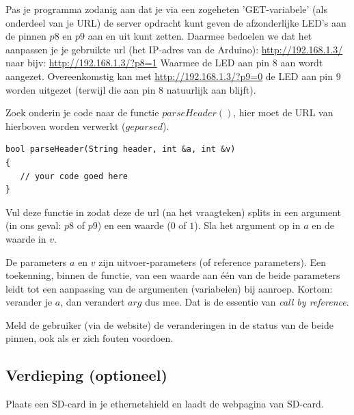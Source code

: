 \begin{exercise}
Pas je programma zodanig aan dat je via een zogeheten 'GET-variabele' (als onderdeel van je URL) de server opdracht kunt geven de afzonderlijke LED’s aan de pinnen $p8$ en $p9$ aan en uit kunt zetten. \newline \newline Daarmee bedoelen we dat het aanpassen je je gebruikte url (het IP-adres van de Arduino): \newline
\url{http://192.168.1.3/} \newline
naar bijv: \newline
\url{http://192.168.1.3/?p8=1} \newline
Waarmee de LED aan pin 8 aan wordt aangezet. Overeenkomstig kan met \newline
\url{http://192.168.1.3/?p9=0}
de LED aan pin 9 worden uitgezet (terwijl die aan pin 8 natuurlijk aan blijft). \newline \par
Zoek onderin je code naar de functie $parseHeader()$, hier moet de URL van hierboven worden verwerkt ($geparsed$). 

\begin{lstlisting}[language=Arduino, numbers=none]
bool parseHeader(String header, int &a, int &v)
{
   // your code goed here 
}
\end{lstlisting}
Vul deze functie in zodat deze de url (na het vraagteken) splits in een argument (in ons geval: $p8$ of $p9$) en een waarde ($0$ of $1$). Sla het argument op in $a$ en de waarde in $v$. 

\begin{remark}
De parameters $a$ en $v$ zijn uitvoer-parameters (of reference parameters). Een toekenning, binnen de functie, van een waarde aan één van de beide parameters leidt tot een aanpassing van de argumenten (variabelen) bij aanroep. Kortom: verander je $a$, dan verandert $arg$ dus mee. Dat is de essentie van \textit{call by reference}. 
\end{remark}

Meld de gebruiker (via de website) de veranderingen in de status van de beide pinnen, ook als er zich fouten voordoen.
\end{exercise}

\subsection{Verdieping (optioneel)}
\begin{exercise}
Plaats een SD-card in je ethernetshield en laadt de webpagina van SD-card.
\end{exercise}

